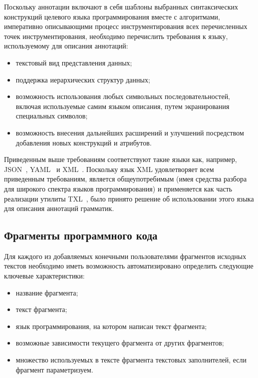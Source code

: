 Поскольку аннотации включают в себя
шаблоны выбранных синтаксических конструкций целевого языка программирования вместе с 
алгоритмами, императивно описывающими процесс инструментирования всех перечисленных точек инструментирования,
необходимо перечислить требования к языку, используемому для описания аннотаций:

\begin{itemize}[noitemsep]
  \item текстовый вид представления данных;
  \item поддержка иерархических структур данных;
  \item возможность использования любых символьных последовательностей, включая используемые самим языком описания, путем экранирования специальных символов;
  \item возможность внесения дальнейших расширений и улучшений посредством добавления новых конструкций и атрибутов.
\end{itemize}

Приведенным выше требованиям соответствуют такие языки как, например, JSON~\cite{json}, YAML~\cite{yaml} и XML~\cite{xml}.
Поскольку язык XML удовлетворяет всем приведенным требованиям, является общеупотребимым (имея средства разбора для широкого спектра языков программирования) и применяется как часть реализации утилиты TXL~\cite{txl-freetxl}, было принято решение об использовании этого языка для описания аннотаций грамматик.

\subsection{Фрагменты программного кода}

Для каждого из добавляемых конечными пользователями фрагментов исходных текстов необходимо иметь возможность автоматизировано определить следующие ключевые характеристики:

\begin{itemize}[noitemsep]
  \item название фрагмента;
  \item текст фрагмента;
  \item язык программирования, на котором написан текст фрагмента;
  \item возможные зависимости текущего фрагмента от других фрагментов;
  \item множество используемых в тексте фрагмента текстовых заполнителей, если фрагмент параметризуем.
\end{itemize}

